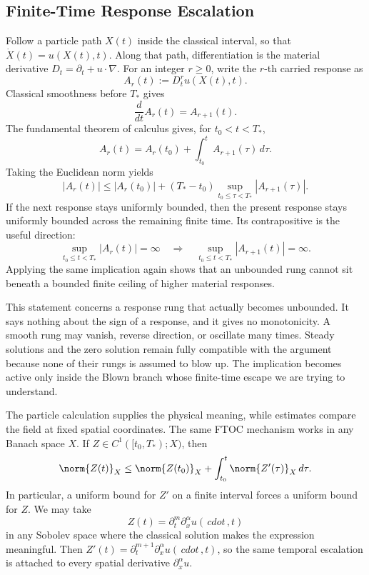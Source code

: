
\subsection{Finite-Time Response Escalation}\label{sub:FiniteTimeResponseEscalation}

Follow a particle path \(X(t)\) inside the classical interval, so that \(\dot X(t)=u(X(t),t)\).
Along that path, differentiation is the material derivative \(D_t=\partial_t+u\cdot\nabla\).
For an integer \(r\geq0\), write the \(r\)-th carried response as
\[
  A_r(t)
  :=
  D_t^r u(X(t),t).
\]
Classical smoothness before \(T_*\) gives
\[
  \frac{d}{dt}A_r(t)=A_{r+1}(t).
\]
The fundamental theorem of calculus gives, for \(t_0<t<T_*\),
\[
  A_r(t)
  =
  A_r(t_0)
  +
  \int_{t_0}^{t}A_{r+1}(\tau)\,d\tau.
\]
Taking the Euclidean norm yields
\[
  |A_r(t)|
  \leq
  |A_r(t_0)|
  +(T_*-t_0)
  \sup_{t_0\leq\tau<T_*}|A_{r+1}(\tau)|.
\]
If the next response stays uniformly bounded, then the present response stays uniformly bounded across the remaining finite time.
Its contrapositive is the useful direction:
\[
  \sup_{t_0\leq t<T_*}|A_r(t)|=\infty
  \quad\Longrightarrow\quad
  \sup_{t_0\leq t<T_*}|A_{r+1}(t)|=\infty.
\]
Applying the same implication again shows that an unbounded rung cannot sit beneath a bounded finite ceiling of higher material responses.

This statement concerns a response rung that actually becomes unbounded.
It says nothing about the sign of a response, and it gives no monotonicity.
A smooth rung may vanish, reverse direction, or oscillate many times.
Steady solutions and the zero solution remain fully compatible with the argument because none of their rungs is assumed to blow up.
The implication becomes active only inside the Blown branch whose finite-time escape we are trying to understand.

The particle calculation supplies the physical meaning, while estimates compare the field at fixed spatial coordinates.
The same FTOC mechanism works in any Banach space \(X\).
If \(Z\in C^1([t_0,T_*);X)\), then
\[
  \norm{Z(t)}_X
  \leq
  \norm{Z(t_0)}_X
  +
  \int_{t_0}^{t}\norm{Z'(\tau)}_X\,d\tau.
\]
In particular, a uniform bound for \(Z'\) on a finite interval forces a uniform bound for \(Z\).
We may take
\[
  Z(t)
  =
  \partial_t^m\partial_x^\alpha u(\,cdot\,,t)
\]
in any Sobolev space where the classical solution makes the expression meaningful.
Then \(Z'(t)=\partial_t^{m+1}\partial_x^\alpha u(\,cdot\,,t)\), so the same temporal escalation is attached to every spatial derivative \(\partial_x^\alpha u\).

